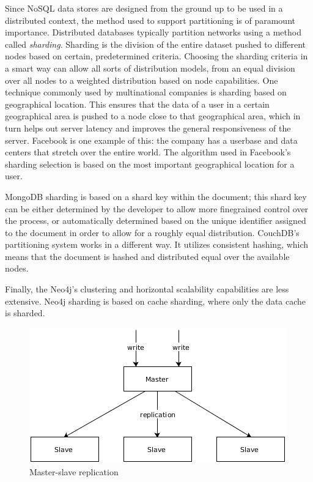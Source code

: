 Since NoSQL data stores are designed from the ground up to be used in a distributed context, the method used to support partitioning is of paramount importance.
Distributed databases typically partition networks using a method called \textit{sharding}.
Sharding is the division of the entire dataset pushed to different nodes based on certain, predetermined criteria.
Choosing the sharding criteria in a smart way can allow all sorts of distribution models, from an equal division over all nodes to a weighted distribution based on node capabilities.
One technique commonly used by multinational companies is sharding based on geographical location.
This ensures that the data of a user in a certain geographical area is pushed to a node close to that geographical area, which in turn helps out server latency and improves the general responsiveness of the server.
Facebook is one example of this: the company has a userbase and data centers that stretch over the entire world.
The algorithm used in Facebook's sharding selection is based on the most important geographical location for a user.

MongoDB sharding is based on a shard key within the document; this shard key can be either determined by the developer to allow more finegrained control over the process, or automatically determined based on the unique identifier assigned to the document in order to allow for a roughly equal distribution.
CouchDB's partitioning system works in a different way.
It utilizes consistent hashing, which means that the document is hashed and distributed equal over the available nodes.

Finally, the Neo4j's clustering and horizontal scalability capabilities are less extensive.
Neo4j sharding is based on cache sharding, where only the data cache is sharded.

\begin{figure}
  \centering
  \includegraphics[width=.6\textwidth]{img/replication-master-slave.png}
  \caption{Master-slave replication}
  \label{fig:replication-master-slave}
\end{figure}

